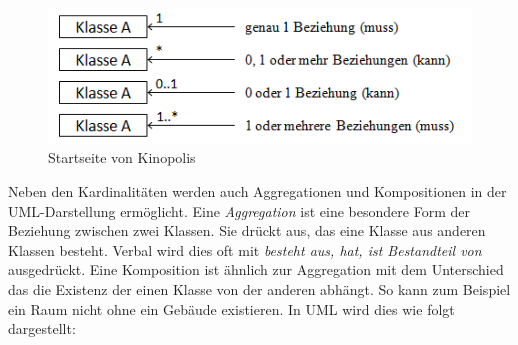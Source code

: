 		\begin{figure}[H]
			\centering 
			\includegraphics[width=15cm]{img/UmlKardinalitaet.png}
			\captionsetup{format=hang}
			\centering\caption[Kardinalitäten nach UML-Notation]{\label{fig:Kardinalitaeten.UML}Startseite von Kinopolis\footnotemark}
		\end{figure}
		
		Neben den Kardinalitäten werden auch Aggregationen und Kompositionen in der UML-Darstellung ermöglicht. Eine \textit{Aggregation} ist eine besondere Form der Beziehung zwischen zwei Klassen. Sie drückt aus, das eine Klasse aus anderen Klassen besteht. Verbal wird dies oft mit \textit{besteht aus, hat, ist Bestandteil von} ausgedrückt. Eine Komposition ist ähnlich zur Aggregation mit dem Unterschied das die Existenz der einen Klasse von der anderen abhängt. So kann zum Beispiel ein Raum nicht ohne ein Gebäude existieren. In UML wird dies wie folgt dargestellt:
		

